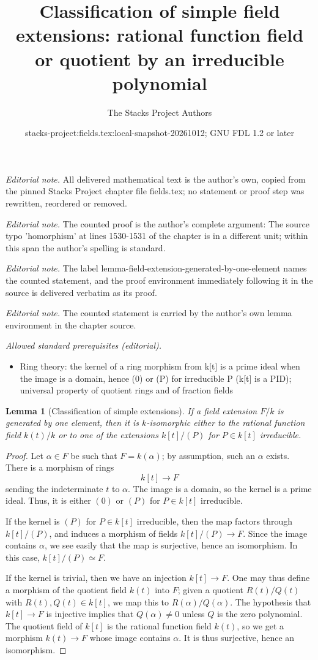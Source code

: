 \documentclass[10pt,a4paper]{amsart}
\title{Classification of simple field extensions: rational function field or quotient by an irreducible polynomial}
\author{The Stacks Project Authors}
\date{stacks-project:fields.tex:local-snapshot-20261012; GNU FDL 1.2 or later}
\theoremstyle{plain}
\newtheorem{lemma}[subsection]{Lemma}
\theoremstyle{definition}
\theoremstyle{remark}
\numberwithin{equation}{subsection}
\begin{document}
\maketitle
\noindent\textit{Editorial note.} All delivered mathematical text is the author's own, copied from the pinned Stacks Project chapter file fields.tex; no statement or proof step was rewritten, reordered or removed.\par\medskip
\noindent\textit{Editorial note.} The counted proof is the author's complete argument: The source typo 'homorphism' at lines 1530-1531 of the chapter is in a different unit; within this span the author's spelling is standard.\par\medskip
\noindent\textit{Editorial note.} The label lemma-field-extension-generated-by-one-element names the counted statement, and the proof environment immediately following it in the source is delivered verbatim as its proof.\par\medskip
\noindent\textit{Editorial note.} The counted statement is carried by the author's own lemma environment in the chapter source.\par\medskip
\noindent\textit{Allowed standard prerequisites (editorial).}\begin{itemize}
\item Ring theory: the kernel of a ring morphism from k[t] is a prime ideal when the image is a domain, hence (0) or (P) for irreducible P (k[t] is a PID); universal property of quotient rings and of fraction fields
\end{itemize}\medskip
\begin{lemma}[Classification of simple extensions]
\label{lemma-field-extension-generated-by-one-element}
If a field extension $F/k$ is generated by one element, then it is
$k$-isomorphic either to the rational function field $k(t)/k$ or to one
of the extensions $k[t]/(P)$ for $P \in k[t]$ irreducible.
\end{lemma}

\begin{proof}
Let $\alpha \in F$ be such that $F = k(\alpha)$; by assumption, such an
$\alpha$ exists. There is a morphism of rings
$$
k[t] \to F
$$
sending the indeterminate $t$ to $\alpha$. The image is a domain, so the
kernel is a prime ideal. Thus, it is either $(0)$ or $(P)$ for $P \in k[t]$
irreducible.

\medskip\noindent
If the kernel is $(P)$ for $P \in k[t]$ irreducible, then the map factors
through $k[t]/(P)$, and induces a morphism of fields $k[t]/(P) \to F$. Since
the image contains $\alpha$, we see easily that the map is surjective, hence
an isomorphism. In this case, $k[t]/(P) \simeq F$.

\medskip\noindent
If the kernel is trivial, then we have an injection $k[t] \to F$.
One may thus define a morphism of the quotient field $k(t)$ into $F$; given a
quotient $R(t)/Q(t)$ with $R(t), Q(t) \in k[t]$, we map this to
$R(\alpha)/Q(\alpha)$. The hypothesis that $k[t] \to F$ is injective implies
that $Q(\alpha) \neq 0$ unless $Q$ is the zero polynomial.
The quotient field of $k[t]$ is the rational function field $k(t)$, so we get
a morphism $k(t) \to F$
whose image contains $\alpha$. It is thus surjective, hence an isomorphism.
\end{proof}
\end{document}
